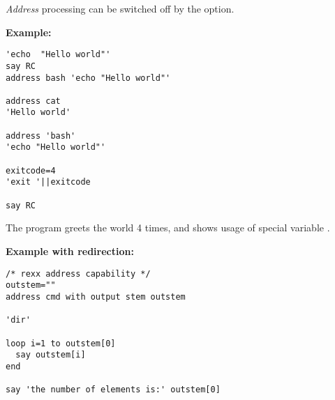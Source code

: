 \emph{Address} processing can be switched off by the  option.

\textbf{Example:}
\begin{lstlisting}
'echo  "Hello world"'
say RC
address bash 'echo "Hello world"'

address cat
'Hello world'

address 'bash'
'echo "Hello world"'

exitcode=4
'exit '||exitcode
 
say RC
\end{lstlisting}
The program greets the world 4 times, and shows usage of special variable .

\textbf{Example with redirection:}
\begin{lstlisting}
/* rexx address capability */
outstem=""
address cmd with output stem outstem

'dir'

loop i=1 to outstem[0]
  say outstem[i]
end

say 'the number of elements is:' outstem[0]
\end{lstlisting}

